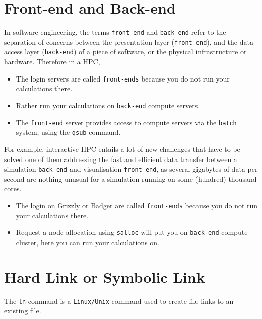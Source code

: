\appendix
\doublespacing

\section{Front-end and Back-end}
In software engineering, the terms \verb+front-end+ and \verb+back-end+ refer to the separation
of concerns between the presentation layer (\verb+front-end+), and the data access layer (\verb+back-end+) of a piece of software, 
or the physical infrastructure or hardware. Therefore in a HPC, 
\begin{itemize}
\item The login servers are called \verb+front-ends+ because you do not run your calculations there.
\item Rather run your calculations on \verb+back-end+ compute servers.
\item The \verb+front-end+ server provides access to compute servers via the \verb+batch+ system, using the \verb+qsub+ command.
\end{itemize}

For example, interactive HPC entails a lot of new challenges that have to be solved one of them addressing
the fast and efficient data transfer between a simulation \verb+back end+ and visualisation \verb+front end+,
as several gigabytes of data per second are nothing unusual for a simulation running on some (hundred) thousand cores.
\begin{itemize}
\item The login on Grizzly or Badger are called \verb+front-ends+ because you do not run your calculations there.
\item Request a node allocation using \verb+salloc+ will put you on \verb+back-end+ compute cluster, here you can run your calculations on.
\end{itemize}

\section{Hard Link or Symbolic Link}
The \verb+ln+ command is a \verb+Linux/Unix+ command used to create file links to an existing file. 
